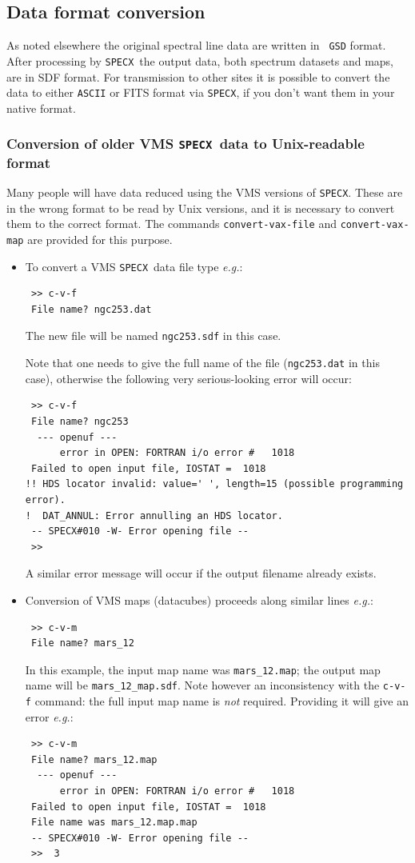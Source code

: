 \documentclass[11pt,twoside]{article}
\newcommand{\eg}{{\it e.g.}}
\newcommand{\SPECX}{{\tt SPECX}}
\begin{document}
\subsection{Data format conversion}
\label{sec:fits-etc}
As noted elsewhere the original spectral line data are written in {\tt
GSD} format. After processing by \SPECX\ the output data, both
spectrum datasets and maps, are in SDF format. For transmission to
other sites it is possible to convert the data to either {\tt ASCII}
or FITS format via
\SPECX , if you don't want them in your native format.

\subsubsection{Conversion of older VMS \SPECX\ data to Unix-readable
format}
\label{sec:cvf_cvm}
Many people will have data reduced using the VMS versions of
\SPECX . These are in the wrong format to be read by Unix versions,
and it is necessary to convert them to the correct format. The
commands {\tt convert-vax-file} and {\tt convert-vax-map} are provided
for this purpose.
\begin{itemize}
\item
To convert a VMS \SPECX\ data file type \eg :
\begin{verbatim}
 >> c-v-f
 File name? ngc253.dat
\end{verbatim}
The new file will be named {\tt ngc253.sdf} in this case.

Note that one needs to give the full name of the file ({\tt{ngc253.dat}}
in this case), otherwise the following very serious-looking error will
occur:

\begin{verbatim}
 >> c-v-f
 File name? ngc253
  --- openuf ---
      error in OPEN: FORTRAN i/o error #   1018
 Failed to open input file, IOSTAT =  1018
!! HDS locator invalid: value=' ', length=15 (possible programming error).
!  DAT_ANNUL: Error annulling an HDS locator.
 -- SPECX#010 -W- Error opening file --
 >> 
\end{verbatim}
A similar error message will occur if the output filename already exists.
\item
Conversion of VMS maps (datacubes) proceeds along similar lines \eg :
\begin{verbatim}
 >> c-v-m
 File name? mars_12
\end{verbatim}

In this example, the input map name was {\tt mars\_12.map}; the output
map name will be {\tt mars\_12\_map.sdf}. Note however an inconsistency
with the {\tt c-v-f} command: the full input map name is {\it not}
required. Providing it will give an error \eg :

\begin{verbatim}
 >> c-v-m
 File name? mars_12.map
  --- openuf ---
      error in OPEN: FORTRAN i/o error #   1018
 Failed to open input file, IOSTAT =  1018
 File name was mars_12.map.map
 -- SPECX#010 -W- Error opening file --
 >>  3 
\end{verbatim}
\end{itemize}
\end{document}
